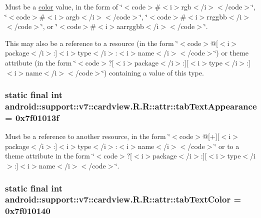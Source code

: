 Must be a \hyperlink{classandroid_1_1support_1_1v7_1_1cardview_1_1_r_1_1color}{color} value, in the form of \char`\"{}$<$code$>$\#$<$i$>$rgb$<$/i$>$$<$/code$>$\char`\"{}, \char`\"{}$<$code$>$\#$<$i$>$argb$<$/i$>$$<$/code$>$\char`\"{}, \char`\"{}$<$code$>$\#$<$i$>$rrggbb$<$/i$>$$<$/code$>$\char`\"{}, or \char`\"{}$<$code$>$\#$<$i$>$aarrggbb$<$/i$>$$<$/code$>$\char`\"{}. 

This may also be a reference to a resource (in the form \char`\"{}$<$code$>$@\mbox{[}$<$i$>$package$<$/i$>$:\mbox{]}$<$i$>$type$<$/i$>$:$<$i$>$name$<$/i$>$$<$/code$>$\char`\"{}) or theme attribute (in the form \char`\"{}$<$code$>$?\mbox{[}$<$i$>$package$<$/i$>$:\mbox{]}\mbox{[}$<$i$>$type$<$/i$>$:\mbox{]}$<$i$>$name$<$/i$>$$<$/code$>$\char`\"{}) containing a value of this type. \hypertarget{classandroid_1_1support_1_1v7_1_1cardview_1_1_r_1_1attr_84a052942353388c579f120da3b4ea0c}{
\subsubsection[{tabTextAppearance}]{\setlength{\rightskip}{0pt plus 5cm}static final int android::support::v7::cardview.R.R::attr::tabTextAppearance = 0x7f01013f}}
\label{classandroid_1_1support_1_1v7_1_1cardview_1_1_r_1_1attr_84a052942353388c579f120da3b4ea0c}


Must be a reference to another resource, in the form \char`\"{}$<$code$>$@\mbox{[}+\mbox{]}\mbox{[}$<$i$>$package$<$/i$>$:\mbox{]}$<$i$>$type$<$/i$>$:$<$i$>$name$<$/i$>$$<$/code$>$\char`\"{} or to a theme attribute in the form \char`\"{}$<$code$>$?\mbox{[}$<$i$>$package$<$/i$>$:\mbox{]}\mbox{[}$<$i$>$type$<$/i$>$:\mbox{]}$<$i$>$name$<$/i$>$$<$/code$>$\char`\"{}. \hypertarget{classandroid_1_1support_1_1v7_1_1cardview_1_1_r_1_1attr_1a906a869cf7ac1df0955fe860882e42}{
\subsubsection[{tabTextColor}]{\setlength{\rightskip}{0pt plus 5cm}static final int android::support::v7::cardview.R.R::attr::tabTextColor = 0x7f010140}}
\label{classandroid_1_1support_1_1v7_1_1cardview_1_1_r_1_1attr_1a906a869cf7ac1df0955fe860882e42}


